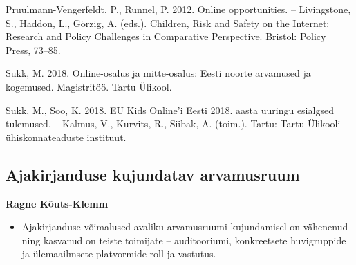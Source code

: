 \documentclass[estonian,]{article}
\providecommand{\tightlist}{%
  \setlength{\itemsep}{0pt}\setlength{\parskip}{0pt}}
\begin{document}
Pruulmann-Vengerfeldt, P., Runnel, P. 2012. Online opportunities. -- Livingstone, S., Haddon, L., Görzig, A. (eds.). Children, Risk and Safety on the Internet: Research and Policy Challenges in Comparative Perspective. Bristol: Policy Press, 73--85.

Sukk, M. 2018. Online-osalus ja mitte-osalus: Eesti noorte arvamused ja kogemused. Magistritöö. Tartu Ülikool.

Sukk, M., Soo, K. 2018. EU Kids Online'i Eesti 2018. aasta uuringu esialgsed tulemused. -- Kalmus, V., Kurvits, R., Siibak, A. (toim.). Tartu: Tartu Ülikooli ühiskonnateaduste instituut.

\hypertarget{ajakirjanduse-kujundatav-arvamusruum}{%
\subsection{Ajakirjanduse kujundatav arvamusruum}\label{ajakirjanduse-kujundatav-arvamusruum}}

\begin{authors}
\textbf{Ragne Kõuts-Klemm}
\end{authors}

\begin{points}
\begin{itemize}
\tightlist
\item
  Ajakirjanduse võimalused avaliku arvamusruumi kujundamisel on
  vähenenud ning kasvanud on teiste toimijate -- auditooriumi,
  konkreetsete huvigruppide ja ülemaailmsete platvormide roll ja
  vastutus.
\end{itemize}
\end{points}
\end{document}
